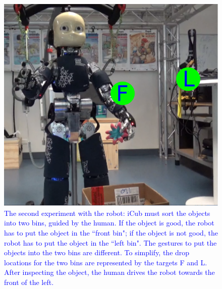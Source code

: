 \documentclass[utf8]{frontiersSCNS} %
\newcommand{\rev}[1]{\textcolor{blue}{#1}}
\begin{document}
\begin{figure}[ht]
\centering
\includegraphics[width=0.5\hsize]{img/realXp.pdf}
\caption{\rev{The second experiment with the robot: iCub must sort the objects into two bins, guided by the human. If the object is good, the robot has to put the object in the ``front bin"; if the object is not good, the robot has to put the object in the ``left bin". The gestures to put the objects into the two bins are different. To simplify, the drop locations for the two bins are represented by the targets F and L. After inspecting the object, the human drives the robot towards the front of the left.}}
\label{figure:sortingiCub}
\end{figure}
\end{document}
